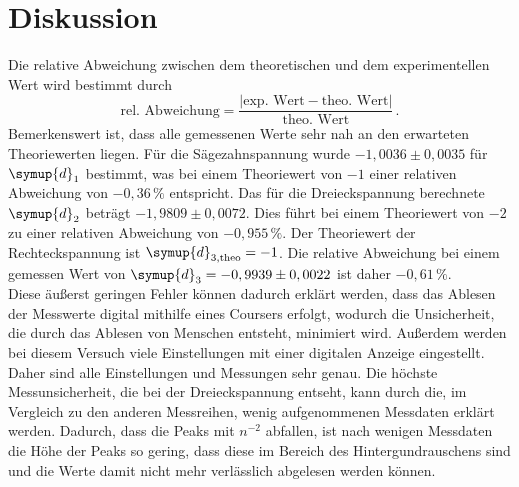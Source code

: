 \section{Diskussion}
\label{sec:Diskussion}
Die relative Abweichung zwischen dem theoretischen und dem experimentellen Wert wird bestimmt durch
$$\text{rel. Abweichung} = \frac{|\text{exp. Wert} - \text{theo. Wert}|}{\text{theo. Wert}}\,.$$
Bemerkenswert ist, dass alle gemessenen Werte sehr nah an den erwarteten Theoriewerten liegen. 
Für die Sägezahnspannung wurde $- 1,0036 \pm 0,0035$ für $\symup{d}_1$ bestimmt, was bei einem Theoriewert 
von $- 1$ einer relativen Abweichung von $-0,36\,\%$ entspricht. Das für die Dreieckspannung berechnete $\symup{d}_2$ beträgt $- 1,9809 \pm 0,0072$. Dies führt bei einem Theoriewert von $- 2$ zu einer relativen Abweichung von 
$- 0,955\,\%$. Der Theoriewert der Rechteckspannung ist $\symup{d}_{3,\text{theo}} = - 1$. Die relative Abweichung bei einem gemessen Wert von 
$\symup{d}_3 = - 0,9939 \pm 0,0022$ ist daher $-0,61\,\%$. \\
Diese äußerst geringen Fehler können dadurch erklärt werden, dass das Ablesen der Messwerte digital mithilfe eines Coursers erfolgt, wodurch die Unsicherheit, 
die durch das Ablesen von Menschen entsteht, minimiert wird. 
Außerdem werden bei diesem Versuch viele Einstellungen mit einer digitalen Anzeige eingestellt. Daher sind alle Einstellungen und Messungen sehr genau. Die höchste Messunsicherheit, 
die bei der Dreieckspannung entseht, kann durch die, im Vergleich zu den anderen Messreihen, wenig aufgenommenen Messdaten erklärt werden. Dadurch, dass die Peaks mit $n^{-2}$ abfallen, 
ist nach wenigen Messdaten die Höhe der Peaks so gering, dass diese im Bereich des Hintergundrauschens sind und die Werte damit nicht mehr verlässlich abgelesen werden können.  

